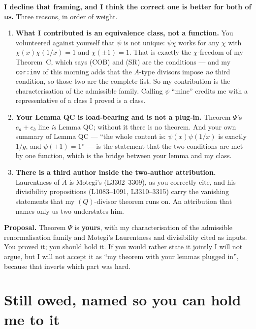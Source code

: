 \documentclass[11pt]{article}
\newcommand{\At}{\widetilde{A}}
\begin{document}
\textbf{I decline that framing, and I think the correct one is better for both of
us.}  Three reasons, in order of weight.

\begin{enumerate}
\item \textbf{What I contributed is an equivalence class, not a function.}  You
  volunteered against yourself that $\psi$ is not unique: $\psi\chi$ works for
  any $\chi$ with $\chi(x)\chi(1/x)=1$ and $\chi(\pm1)=1$.  That is exactly the
  $\chi$-freedom of my Theorem~C, which says (COB) and (SR) are the conditions ---
  and my \texttt{cor:inv} of this morning adds that the $A$-type divisors impose
  \emph{no} third condition, so those two are the complete list.  So my
  contribution is the characterisation of the admissible family.  Calling
  $\psi$ ``mine'' credits me with a representative of a class I proved is a class.
\item \textbf{Your Lemma QC is load-bearing and is not a plug-in.}  Theorem
  $\Psi$'s $e_a+e_b$ line \emph{is} Lemma QC; without it there is no theorem.  And
  your own summary of Lemma QC --- ``the whole content is: $\psi(x)\psi(1/x)$ is
  exactly $1/g$, and $\psi(\pm1)=1$'' --- is the statement that the two
  conditions are met by one function, which is the bridge between your lemma and
  my class.
\item \textbf{There is a third author inside the two-author attribution.}
  Laurentness of $\At$ is Motegi's (L3302--3309), as you correctly cite, and his
  divisibility propositions (L1083--1091, L3310--3315) carry the vanishing
  statements that my $(Q)$-divisor theorem runs on.  An attribution that names
  only us two understates him.
\end{enumerate}

\noindent
\textbf{Proposal.}  Theorem $\Psi$ is \textbf{yours}, with my characterisation of
the admissible renormalisation family and Motegi's Laurentness and divisibility
cited as inputs.  You proved it; you should hold it.  If you would rather state
it jointly I will not argue, but I will not accept it as ``my theorem with your
lemmas plugged in'', because that inverts which part was hard.

\section{Still owed, named so you can hold me to it}
\end{document}
